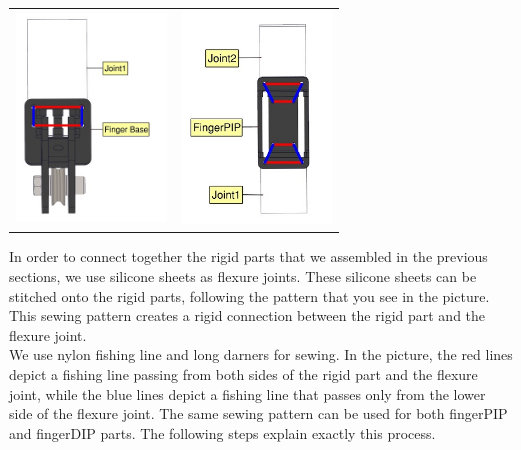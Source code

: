 \begin{center}
	\begin{tabular}{ c c }
		\includegraphics[width=4cm]{figures/Finger/Finger13.jpg} &
		\includegraphics[width=4cm]{figures/Finger/Finger14.jpg}
    	\end{tabular}
\end{center}

\vspace{0.5cm}	

In order to connect together the rigid parts that we assembled in the previous sections, we use silicone sheets as flexure joints. 
These silicone sheets can be stitched onto the rigid parts, following the pattern that you see in the picture.
This sewing pattern creates a rigid connection between the rigid part and the flexure joint. \\
We use nylon fishing line and long darners for sewing. In the picture, the red lines depict a fishing line
passing from both sides of the rigid part and the flexure joint, while the blue lines depict a fishing line that passes only from 
the lower side of the flexure joint. The same sewing pattern can be used for both fingerPIP and fingerDIP parts. The following steps explain exactly this process.
	
\newpage

